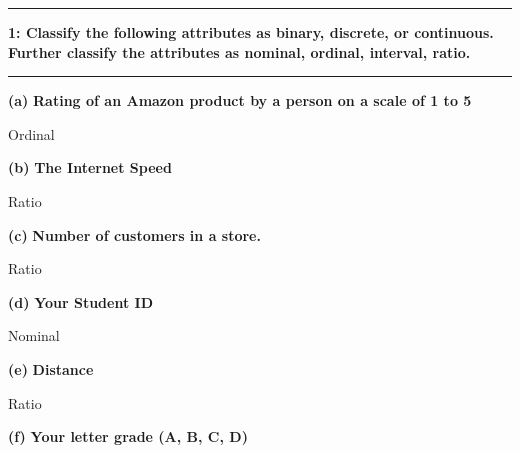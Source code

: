\documentclass[11pt]{article}
\newcommand\question[2]{\vspace{.25in}\hrule\textbf{#1: #2}\vspace{.5em}\hrule\vspace{.10in}}
\renewcommand\part[1]{\vspace{.10in}\textbf{(#1)}}
\begin{document}
\raggedright
		\lstset{language=Python}  
	
	
\newcommand\NAME{Tsungai Chibanga}  %
\newcommand\HWNUM{1}              %




 
\question{1}{Classify the following attributes as binary, discrete, or continuous.  Further classify the attributes as nominal, ordinal, interval, ratio.} 


\part{a} \textbf{Rating of an Amazon product by a person on a scale of 1 to 5} 

Ordinal

\part{b} \textbf{The Internet Speed}

Ratio


\part{c} \textbf{Number of customers in a store.} 

Ratio

\part{d} \textbf{Your Student ID}

Nominal

\part{e} \textbf{Distance }

Ratio


\part{f} \textbf{Your letter grade (A, B, C, D)}
\end{document}
